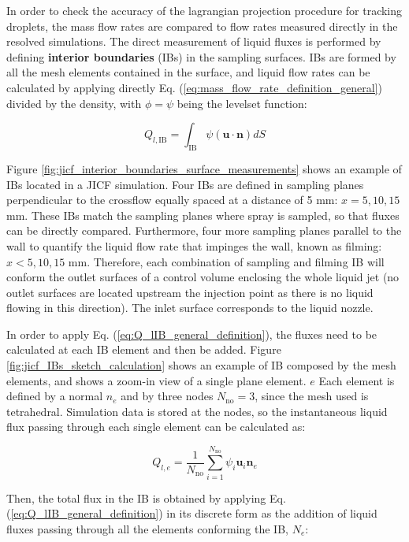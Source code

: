 In order to check the accuracy of the lagrangian projection procedure for tracking droplets, the mass flow rates are compared to flow rates measured directly in the resolved simulations. The direct measurement of liquid fluxes is performed by defining \textbf{interior boundaries} (IBs) in the sampling surfaces. IBs are formed by all the mesh elements contained in the surface, and liquid flow rates can be calculated by applying directly Eq. (\ref{eq:mass_flow_rate_definition_general}) divided by the density, with $\phi = \psi$ being the levelset function:

\begin{equation}
\label{eq:Q_lIB_general_definition}
Q_{l,\mathrm{IB}} = \int_{\mathrm{IB}} \psi \left( \textbf{u} \cdot \textbf{n} \right) dS
\end{equation}

Figure \ref{fig:jicf_interior_boundaries_surface_measurements} shows an example of IBs located in a JICF simulation. Four IBs are defined in sampling planes perpendicular to the crossflow equally spaced at a distance of 5 mm: $x = 5, 10, 15$ mm. These IBs match the sampling planes where spray is sampled, so that fluxes can be directly compared. Furthermore, four more sampling planes parallel to the wall to quantify the liquid flow rate that impinges the wall, known as filming: $x <5, 10, 15$ mm. Therefore, each combination of sampling and filming IB will conform the outlet surfaces of a control volume enclosing the whole liquid jet (no outlet surfaces are located upstream the injection point as there is no liquid flowing in this direction). The inlet surface corresponds to the liquid nozzle.



In order to apply Eq. (\ref{eq:Q_lIB_general_definition}), the fluxes need to be calculated at each IB element and then be added. Figure \ref{fig:jicf_IBs_sketch_calculation} shows an example of IB composed by the mesh elements, and shows a zoom-in view of a single plane element. $e$ Each element is defined by a normal $n_e$ and by three nodes $N_\mathrm{no} = 3$, since the mesh used is tetrahedral. Simulation data is stored at the nodes, so the instantaneous liquid flux passing through each single element can be calculated as:

\begin{equation}
Q_{l,e} = \frac{1}{N_\mathrm{no}} \sum_{i=1}^{N_\mathrm{no}} \psi_i \textbf{u}_i \textbf{n}_e
\end{equation}

Then, the total flux in the IB is obtained by applying Eq. (\ref{eq:Q_lIB_general_definition}) in its discrete form as the addition of liquid fluxes passing through all the elements conforming the IB, $N_e$:

